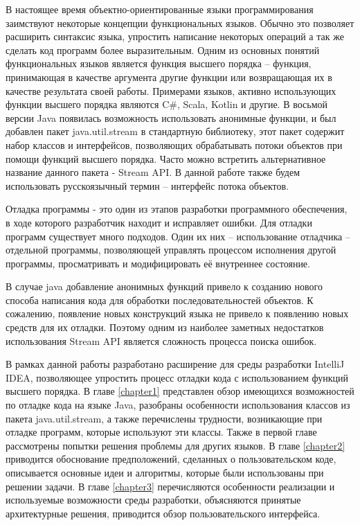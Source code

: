 В настоящее время объектно-ориентированные языки программирования заимствуют некоторые концепции функциональных языков.  Обычно это позволяет расширить синтаксис языка, упростить написание некоторых операций а так же сделать код программ более выразительным. Одним из основных понятий функциональных языков является функция высшего порядка -- функция, принимающая в качестве аргумента другие функции или возвращающая их в качестве результата своей работы. Примерами языков, активно использующих функции высшего порядка являются C\#, Scala, Kotlin и другие. В восьмой версии Java появилась возможность использовать анонимные функции, и был добавлен пакет java.util.stream в стандартную библиотеку, этот пакет содержит набор классов и интерфейсов, позволяющих обрабатывать потоки объектов при помощи функций высшего порядка. Часто можно встретить альтернативное название данного пакета - Stream API. В данной работе также будем использовать русскоязычный термин -- интерфейс потока объектов.

Отладка программы - это один из этапов разработки программного обеспечения, в ходе которого разработчик находит и исправляет ошибки. Для отладки программ существует много подходов. Один их них -- использование отладчика -- отдельной программы, позволяющей управлять процессом исполнения другой программы, просматривать и модифицировать её внутреннее состояние.

В случае java добавление анонимных функций привело к созданию нового способа написания кода для обработки последовательностей объектов. К сожалению, появление новых конструкций языка не привело к появлению новых средств для их отладки. Поэтому одним из наиболее заметных недостатков использования Stream API является сложность процесса поиска ошибок.

В рамках данной работы разработано расширение для среды разработки IntelliJ IDEA, позволяющее упростить процесс отладки кода с использованием функций высшего порядка. В главе \ref{chapter1} представлен обзор имеющихся возможностей по отладке кода на языке Java, разобраны особенности использования классов из пакета java.util.stream, а также перечислены трудности, возникающие при отладке программ, которые используют эти классы. Также в первой главе рассмотрены попытки решения проблемы для других языков. В главе \ref{chapter2} приводится обоснование предположений, сделанных о пользовательском коде, описывается основные идеи и алгоритмы, которые были использованы при решении задачи. В главе \ref{chapter3} перечисляются особенности реализации и используемые возможности среды разработки, объясняются принятые архитектурные решения, приводится обзор пользовательского интерфейса.

